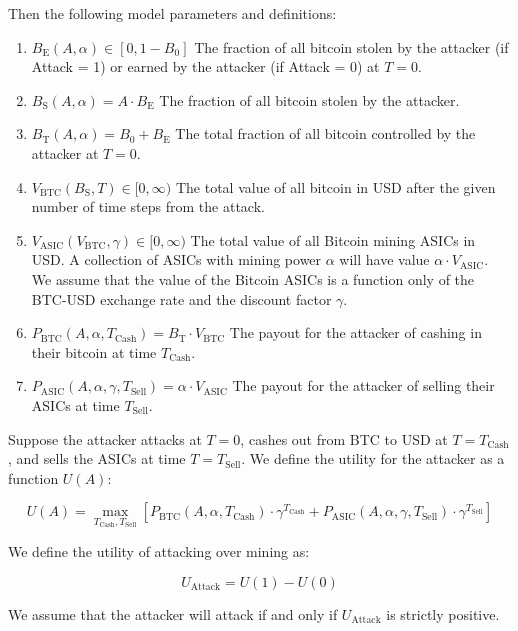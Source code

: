 \documentclass[12pt]{article}
\newcommand*{\Attack}{A}
\newcommand*{\Time}{T}
\newcommand*{\ABtcOrig}{{B_0}}
\newcommand*{\ABtcEarned}{{B_{\mathrm{E}}}}
\newcommand*{\ABtcStolen}{{B_{\mathrm{S}}}}
\newcommand*{\ABtcTotal}{{B_{\mathrm{T}}}}
\newcommand*{\BtcValue}{{V_{\mathrm{BTC}}}}
\newcommand*{\AsicValue}{{V_{\mathrm{ASIC}}}}
\newcommand*{\TimeCashOut}{{T_{\mathrm{Cash}}}}
\newcommand*{\TimeSellAsics}{{T_{\mathrm{Sell}}}}
\newcommand*{\Utility}{U}
\newcommand*{\AttackUtility}{{U_{\mathrm{Attack}}}}
\newcommand*{\PayoffBtc}{{P_{\mathrm{BTC}}}}
\newcommand*{\PayoffAsic}{{P_{\mathrm{ASIC}}}}
\newenvironment{defs}
  { \begin{enumerate}[labelindent=0pt,labelwidth=2.5in,itemindent=0em,align=parleft,leftmargin=!] }
  { \end{enumerate} }
\begin{document}
Then the following model parameters and definitions:

\begin{defs}
  \item[{$\ABtcEarned(\Attack, \alpha) \in [0, 1 - B_0]$}]
    The fraction of all bitcoin stolen by the attacker (if Attack = 1) or
    earned by the attacker (if Attack = 0) at $T = 0$.
  \item[{$\ABtcStolen(\Attack, \alpha)
      = \Attack \cdot \ABtcEarned$}]
    The fraction of all bitcoin stolen by the attacker.
  \item[{$\ABtcTotal(\Attack, \alpha)
      = \ABtcOrig + \ABtcEarned$}]
    The total fraction of all bitcoin controlled by the attacker at $T = 0$.
  \item[{$\BtcValue(\ABtcStolen, \Time) \in [0, \infty)$}]
    The total value of all bitcoin in USD after the given number of time steps
    from the attack.
  \item[{$\AsicValue(\BtcValue, \gamma) \in [0, \infty)$}]
    The total value of all Bitcoin mining ASICs in USD. A collection of ASICs
    with mining power $\alpha$ will have value $\alpha \cdot
    \AsicValue$.
    We assume that the value of the Bitcoin ASICs is a function only of the
    BTC-USD exchange rate and the discount factor $\gamma$.
  \item[{$\PayoffBtc(\Attack, \alpha, \TimeCashOut)
      = \ABtcTotal \cdot \BtcValue$}]
    The payout for the attacker of cashing in their bitcoin at time $\TimeCashOut$.
  \item[{$\PayoffAsic(\Attack, \alpha, \gamma, \TimeSellAsics)
      = \alpha \cdot \AsicValue$}]
    The payout for the attacker of selling their ASICs at time $\TimeSellAsics$.
\end{defs}

Suppose the attacker attacks at $\Time = 0$, cashes out from BTC to USD at
$\Time = \TimeCashOut$, and sells the ASICs at time $\Time = \TimeSellAsics$.
We define the utility for the attacker as a function $\Utility(\Attack)$:

\[
  \Utility(\Attack) =
  \max_{\TimeCashOut, \TimeSellAsics}
    \left[
        \PayoffBtc(\Attack, \alpha, \TimeCashOut)
          \cdot \gamma^\TimeCashOut
        + \PayoffAsic(\Attack, \alpha, \gamma, \TimeSellAsics)
          \cdot \gamma^\TimeSellAsics
    \right]
\]

We define the utility of attacking over mining as:

\[
  \AttackUtility = \Utility(1) - \Utility(0)
\]

We assume that the attacker will attack if and only if $\AttackUtility$ is
strictly positive.
\end{document}

